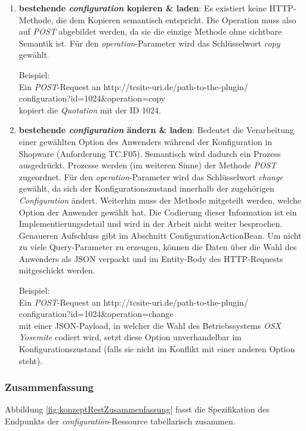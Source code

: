 \documentclass[12pt,a4paper,bibliography=totocnumbered,listof=totoc]{scrartcl}
\begin{document}
\begin{enumerate}
\begin{addmargin}[25pt]{0pt}
\end{addmargin}
\item \textbf{bestehende \emph{configuration} kopieren \& laden}: Es existiert keine HTTP-Methode, die dem Kopieren semantisch entspricht. Die Operation muss also auf \emph{POST} abgebildet werden, da sie die einzige Methode ohne sichtbare Semantik ist. Für den \emph{operation}-Parameter wird das Schlüsselwort \emph{copy} gewählt.
\begin{addmargin}[25pt]{0pt} 
Beispiel:\\
Ein \emph{POST}-Request an \glqq http://tcsite-uri.de/path-to-the-plugin/
\\configuration?id=1024\&operation=copy\grqq{}
\\kopiert die \emph{Quotation} mit der ID 1024.
\end{addmargin}
\item \textbf{bestehende \emph{configuration} ändern \& laden}: Bedeutet die Verarbeitung einer gewählten Option des Anwenders während der Konfiguration in Shopware (Anforderung TC.F05). Semantisch wird dadurch ein Prozess ausgedrückt. Prozesse werden (im weiteren Sinne) der Methode \emph{POST} zugeordnet. Für den \emph{operation}-Parameter wird das Schlüsselwort \emph{change} gewählt, da sich der Konfigurationszustand innerhalb der zugehörigen \emph{Configuration} ändert. Weiterhin muss der Methode mitgeteilt werden, welche Option der Anwender gewählt hat. Die Codierung dieser Information ist ein Implementierungsdetail und wird in der Arbeit nicht weiter besprochen. Genaueren Aufschluss gibt \citet{tactonTCsiteDevelopmentManual} im Abschnitt \glqq ConfigurationActionBean\grqq{}. Um nicht zu viele Query-Parameter zu erzeugen, können die Daten über die Wahl des Anwenders als JSON verpackt und im Entity-Body des HTTP-Requests mitgeschickt werden.
\begin{addmargin}[25pt]{0pt} 
Beispiel:\\
Ein \emph{POST}-Request an \glqq http://tcsite-uri.de/path-to-the-plugin/
\\configuration?id=1024\&operation=change\grqq{}
\\mit einer JSON-Payload, in welcher die Wahl des Betriebssystems \emph{OSX Yosemite} codiert wird, setzt diese Option unverhandelbar im Konfigurationszustand (falls sie nicht im Konflikt mit einer anderen Option steht).
\end{addmargin}
\end{enumerate}

\subsubsection{Zusammenfassung}
Abbildung \ref{fig:konzeptRestZusammenfassung} fasst die Spezifikation des Endpunkts der \emph{configuration}-Ressource tabellarisch zusammen.
\end{document}
